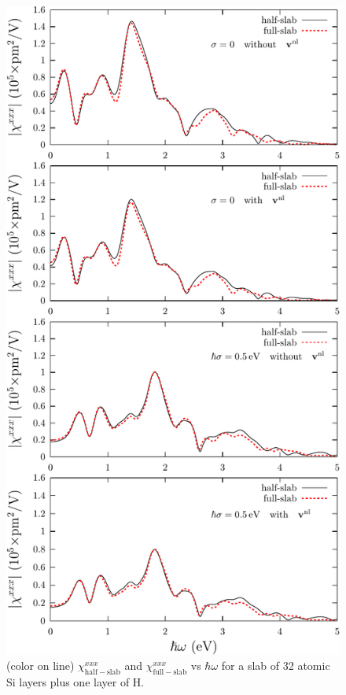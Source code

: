 \documentclass[floatfix,prb,aps,superscriptaddress,11pt,preprint,letterpaper]{revtex4}
\begin{document}
\begin{figure}
\centering 
\includegraphics[scale=.8]{plots/fig2}
\caption{(color on line) 
$\chi^{xxx}_{\mathrm{half-slab}}$
and 
$\chi^{xxx}_{\mathrm{full-slab}}$
vs $\hbar\omega$ for a slab of 32 
atomic Si layers plus one layer of H. 
\label{fig2}} 
\end{figure}
\end{document}

